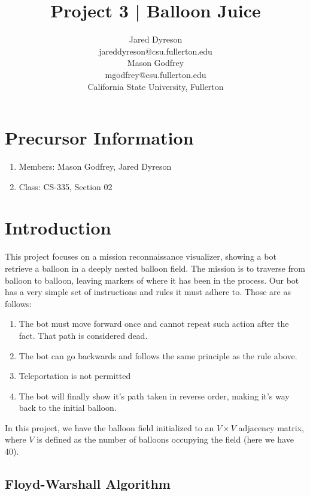 \documentclass{article}
\title{Project 3 | Balloon Juice}
\author{Jared Dyreson \\
        jareddyreson@csu.fullerton.edu \\
        Mason Godfrey \\
        mgodfrey@csu.fullerton.edu \\
        California State University, Fullerton}
\date
\begin{document}
\maketitle
\tableofcontents

\newpage

\section{Precursor Information}

\begin{enumerate}
\item Members: Mason Godfrey, Jared Dyreson
\item Class: CS-335, Section 02
\end{enumerate}

\section{Introduction}

This project focuses on a mission reconnaissance visualizer, showing a bot retrieve a balloon in a deeply nested balloon field.
The mission is to traverse from balloon to balloon, leaving markers of where it has been in the process.
Our bot has a very simple set of instructions and rules it must adhere to.
Those are as follows:

\begin{enumerate}
\item The bot must move forward once and cannot repeat such action after the fact. That path is considered dead.
\item The bot can go backwards and follows the same principle as the rule above.
\item Teleportation is not permitted
\item The bot will finally show it's path taken in reverse order, making it's way back to the initial balloon.
\end{enumerate}

\begin{flushleft}
In this project, we have the balloon field initialized to an $V \times V$ adjacency matrix, where $V$ is defined as the number of balloons occupying the field (here we have 40).
\end{flushleft}

\subsection{Floyd-Warshall Algorithm}
\end{document}
